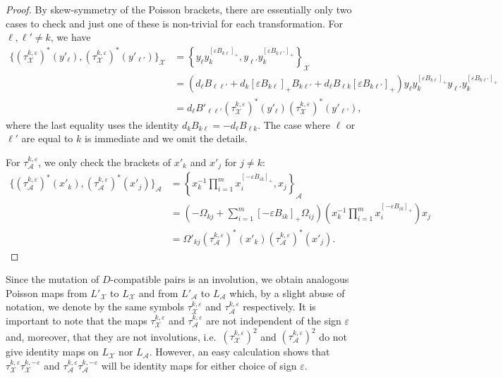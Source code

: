 \documentclass{amsart}
\numberwithin{equation}{section}
\newcommand{\cA}{\mathcal{A}}
\newcommand{\cX}{\mathcal{X}}
\begin{document}
\begin{proof}
  By skew-symmetry of the Poisson brackets, there are essentially only two cases to check and just one of these is non-trivial for each transformation.
  For $\ell,\ell'\ne k$, we have
  \begin{align*}
    \{(\tau_\cX^{k,\varepsilon})^*(y'_\ell),(\tau_\cX^{k,\varepsilon})^*(y'_{\ell'})\}_\cX
    &=\left\{y_\ell y_k^{[\varepsilon B_{k\ell}]_+},y_{\ell'} y_k^{[\varepsilon B_{k\ell'}]_+}\right\}_\cX\\
    &=(d_\ell B_{\ell\ell'}+d_k[\varepsilon B_{k\ell}]_+B_{k\ell'}+d_\ell B_{\ell k}[\varepsilon B_{k\ell'}]_+) y_\ell y_k^{[\varepsilon B_{k\ell}]_+} y_{\ell'} y_k^{[\varepsilon B_{k\ell'}]_+}\\
    &=d_\ell B'_{\ell\ell'} (\tau_\cX^{k,\varepsilon})^*(y'_\ell) (\tau_\cX^{k,\varepsilon})^*(y'_{\ell'}),
  \end{align*}
  where the last equality uses the identity $d_kB_{k\ell}=-d_\ell B_{\ell k}$.
  The case where $\ell$ or $\ell'$ are equal to $k$ is immediate and we omit the details.

  For $\tau_\cA^{k,\varepsilon}$, we only check the brackets of $x'_k$ and $x'_j$ for $j\ne k$:
  \begin{align*}
    \{(\tau_\cA^{k,\varepsilon})^*(x'_k),(\tau_\cA^{k,\varepsilon})^*(x'_j)\}_\cA
    &=\left\{x_k^{-1}\prod\limits_{i=1}^m x_i^{[-\varepsilon B_{ik}]_+},x_j\right\}_\cA\\
    &=\left(-\Omega_{kj}+\sum_{i=1}^m [-\varepsilon B_{ik}]_+\Omega_{ij}\right) \left(x_k^{-1} \prod\limits_{i=1}^m x_i^{[-\varepsilon B_{ik}]_+}\right)x_j\\
    &=\Omega'_{kj} (\tau_\cA^{k,\varepsilon})^*(x'_k) (\tau_\cA^{k,\varepsilon})^*(x'_j).
  \end{align*}
\end{proof}

Since the mutation of $D$-compatible pairs is an involution, we obtain analogous Poisson maps from $L'_\cX$ to $L_\cX$ and from $L'_\cA$ to $L_\cA$ which, by a slight abuse of notation, we denote by the same symbols $\tau_\cX^{k,\varepsilon}$ and $\tau_\cA^{k,\varepsilon}$ respectively.
It is important to note that the maps $\tau_\cX^{k,\varepsilon}$ and $\tau_\cA^{k,\varepsilon}$ are not independent of the sign $\varepsilon$ and, moreover, that they are not involutions, i.e.\ $(\tau_\cX^{k,\varepsilon})^2$ and $(\tau_\cA^{k,\varepsilon})^2$ do not give identity maps on $L_\cX$ nor $L_\cA$.
However, an easy calculation shows that $\tau_\cX^{k,\varepsilon}\tau_\cX^{k,-\varepsilon}$ and $\tau_\cA^{k,\varepsilon}\tau_\cA^{k,-\varepsilon}$ will be identity maps for either choice of sign $\varepsilon$.
\end{document}
